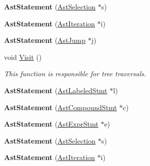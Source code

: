 \begin{DoxyCompactItemize}
\item 
\hypertarget{classAstStatement_a8bc036f0b37cacbfa99159e4c57207ec}{{\bfseries Ast\-Statement} (\hyperlink{classAstSelection}{Ast\-Selection} $\ast$s)}\label{classAstStatement_a8bc036f0b37cacbfa99159e4c57207ec}

\item 
\hypertarget{classAstStatement_ae26acf207adc2d426e558e5889b43b54}{{\bfseries Ast\-Statement} (\hyperlink{classAstIteration}{Ast\-Iteration} $\ast$i)}\label{classAstStatement_ae26acf207adc2d426e558e5889b43b54}

\item 
\hypertarget{classAstStatement_a80c754bbc909f7e2e7938e90485d7065}{{\bfseries Ast\-Statement} (\hyperlink{classAstJump}{Ast\-Jump} $\ast$j)}\label{classAstStatement_a80c754bbc909f7e2e7938e90485d7065}

\item 
void \hyperlink{classAstStatement_a1f1570931e373fe2f1e18ce417236ee4}{Visit} ()
\begin{DoxyCompactList}\small\item\em This function is responsible for tree traversals. \end{DoxyCompactList}\item 
\hypertarget{classAstStatement_a51c4738b3eb4d0ce7f7937580827df49}{{\bfseries Ast\-Statement} (\hyperlink{classAstLabeledStmt}{Ast\-Labeled\-Stmt} $\ast$l)}\label{classAstStatement_a51c4738b3eb4d0ce7f7937580827df49}

\item 
\hypertarget{classAstStatement_a06ab5906e58059421ffca709140ad1b0}{{\bfseries Ast\-Statement} (\hyperlink{classAstCompoundStmt}{Ast\-Compound\-Stmt} $\ast$c)}\label{classAstStatement_a06ab5906e58059421ffca709140ad1b0}

\item 
\hypertarget{classAstStatement_a8a44969c79b381d9cef932fc93d99339}{{\bfseries Ast\-Statement} (\hyperlink{classAstExprStmt}{Ast\-Expr\-Stmt} $\ast$e)}\label{classAstStatement_a8a44969c79b381d9cef932fc93d99339}

\item 
\hypertarget{classAstStatement_a8bc036f0b37cacbfa99159e4c57207ec}{{\bfseries Ast\-Statement} (\hyperlink{classAstSelection}{Ast\-Selection} $\ast$s)}\label{classAstStatement_a8bc036f0b37cacbfa99159e4c57207ec}

\item 
\hypertarget{classAstStatement_ae26acf207adc2d426e558e5889b43b54}{{\bfseries Ast\-Statement} (\hyperlink{classAstIteration}{Ast\-Iteration} $\ast$i)}\label{classAstStatement_ae26acf207adc2d426e558e5889b43b54}


\end{DoxyCompactItemize}
